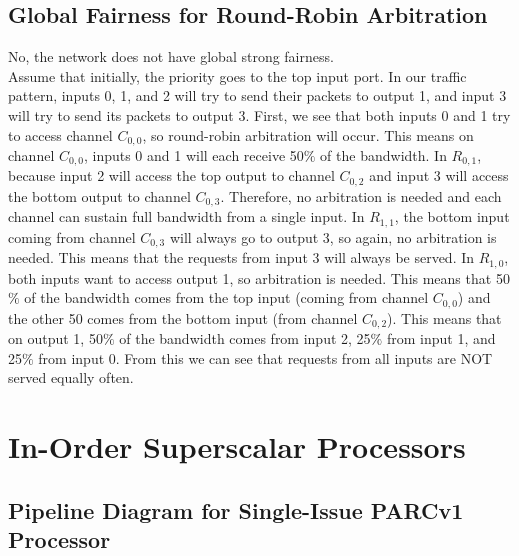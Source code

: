 \documentclass[10pt]{article}
\begin{document}
\subsection{Global Fairness for Round-Robin Arbitration}
No, the network does not have global strong fairness.\\
Assume that initially, the priority goes to the top input port. In our traffic pattern, inputs 0, 1, and 2 will try to send their packets to output 1, and input 3 will try to send its packets to output 3. First, we see that both inputs 0 and 1 try to access channel $C_{0,0}$, so round-robin arbitration will occur. This means on channel $C_{0,0}$, inputs 0 and 1 will each receive 50$\%$ of the bandwidth. In $R_{0,1}$, because input 2 will access the top output to channel $C_{0,2}$ and input 3 will access the bottom output to channel $C_{0,3}$. Therefore, no arbitration is needed and each channel can sustain full bandwidth from a single input. In $R_{1,1}$, the bottom input coming from channel $C_{0,3}$ will always go to output 3, so again, no arbitration is needed. This means that the requests from input 3 will always be served. In $R_{1,0}$, both inputs want to access output 1, so arbitration is needed. This means that 50$\%$ of the bandwidth comes from the top input (coming from channel $C_{0,0}$) and the other 50 comes from the bottom input (from channel $C_{0,2}$). This means that on output 1, 50$\%$ of the bandwidth comes from input 2, 25$\%$ from input 1, and 25$\%$ from input 0. From this we can see that requests from all inputs are NOT served equally often. 
\cleardoublepage
\section{In-Order Superscalar Processors}

\subsection{Pipeline Diagram for Single-Issue PARCv1 Processor}
\end{document}

